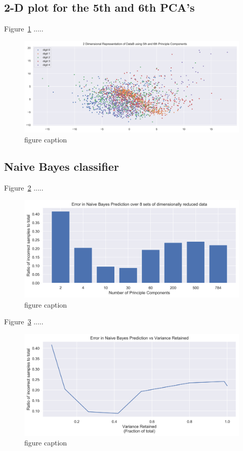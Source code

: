 \clearpage{}
\subsection{2-D plot for the 5th and 6th PCA's}

Figure~\ref{fig:fig4} .....
\begin{figure}[htb]
 \centering
\includegraphics[width=\textwidth]{assignment1/2-3-dimreduction_pca5_6.png}
\caption{\label{fig:fig4}figure caption}
\end{figure}



\clearpage{}
\subsection{Naive Bayes classifier}

Figure~\ref{fig:fig5} .....
\begin{figure}[htb]
 \centering
\includegraphics[width=\textwidth]{assignment1/2-4-NBprediction_bar.png}
\caption{\label{fig:fig5}figure caption}
\end{figure}

Figure~\ref{fig:fig6} .....
\begin{figure}[htb]
 \centering
\includegraphics[width=\textwidth]{assignment1/2-4-NBprediction_line.png}
\caption{\label{fig:fig6}figure caption}
\end{figure}



